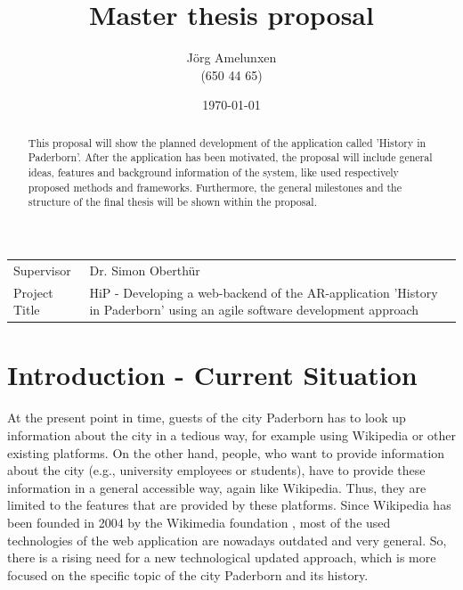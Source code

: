 \documentclass[a4page]{article}
\author{J\"org Amelunxen \\
(650 44 65)
}
\title{Master thesis proposal 
}
\date{\today}
\begin{document}
\maketitle

\newcommand{\stab}[1]{\hspace{.05\textwidth}\rlap{#1}}
\newcommand{\tab}[1]{\hspace{.1\textwidth}\rlap{#1}}

\begin{table}[!th]
\begin{tabular}{l p{}}
Supervisor & Dr. Simon Oberth\"ur \\
Project Title &  HiP - Developing a web-backend of the AR-application 'History in Paderborn' using an agile software development approach
\end{tabular}
\end{table}

\begin{abstract}
This proposal will show the planned development of the application called 'History in Paderborn'. After the application has been motivated, the proposal will include general ideas, features and background information of the system, like used respectively proposed methods and frameworks. Furthermore, the general milestones and the structure of the final thesis will be shown within the proposal. 
\end{abstract}

\section{Introduction - Current Situation}
At the present point in time, guests of the city Paderborn has to look up information about the city in a tedious way, for example using Wikipedia or other existing platforms. On the other hand, people, who want to provide information about the city (e.g., university employees or students), have to provide these information in a general accessible way, again like Wikipedia. Thus, they are limited to the features that are provided by these platforms. Since Wikipedia has been founded in 2004 by the Wikimedia foundation \cite{wikimedia}, most of the used technologies of the web application are nowadays outdated and very general. So, there is a rising need for a new technological updated approach, which is more focused on the specific topic of the city Paderborn and its history. 
\end{document}
